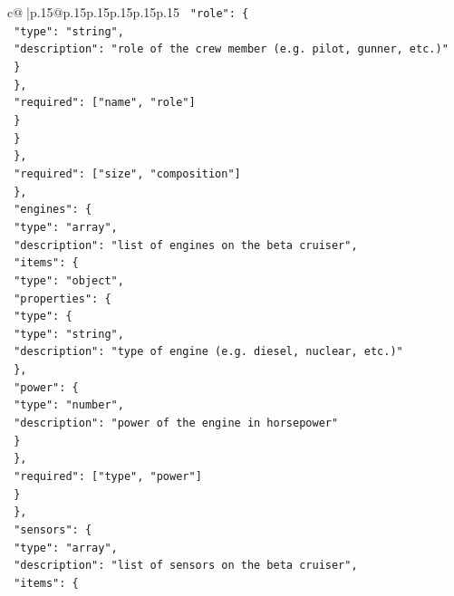 \documentclass{article}
\begin{document}
{\begin{supertabular}{c@{$\;$}|p{.15\linewidth}@{}p{.15\linewidth}p{.15\linewidth}p{.15\linewidth}p{.15\linewidth}p{.15\linewidth}}
{{{\texttt{              "role": \{} \\
\texttt{                "type": "string",} \\
\texttt{                "description": "role of the crew member (e.g. pilot, gunner, etc.)"} \\
\texttt{              \}} \\
\texttt{            \},} \\
\texttt{            "required": {[}"name", "role"{]}} \\
\texttt{          \}} \\
\texttt{        \}} \\
\texttt{      \},} \\
\texttt{      "required": {[}"size", "composition"{]}} \\
\texttt{    \},} \\
\texttt{    "engines": \{} \\
\texttt{      "type": "array",} \\
\texttt{      "description": "list of engines on the beta cruiser",} \\
\texttt{      "items": \{} \\
\texttt{        "type": "object",} \\
\texttt{        "properties": \{} \\
\texttt{          "type": \{} \\
\texttt{            "type": "string",} \\
\texttt{            "description": "type of engine (e.g. diesel, nuclear, etc.)"} \\
\texttt{          \},} \\
\texttt{          "power": \{} \\
\texttt{            "type": "number",} \\
\texttt{            "description": "power of the engine in horsepower"} \\
\texttt{          \}} \\
\texttt{        \},} \\
\texttt{        "required": {[}"type", "power"{]}} \\
\texttt{      \}} \\
\texttt{    \},} \\
\texttt{    "sensors": \{} \\
\texttt{      "type": "array",} \\
\texttt{      "description": "list of sensors on the beta cruiser",} \\
\texttt{      "items": \{} \\
}}}
\end{supertabular}}
\end{document}
